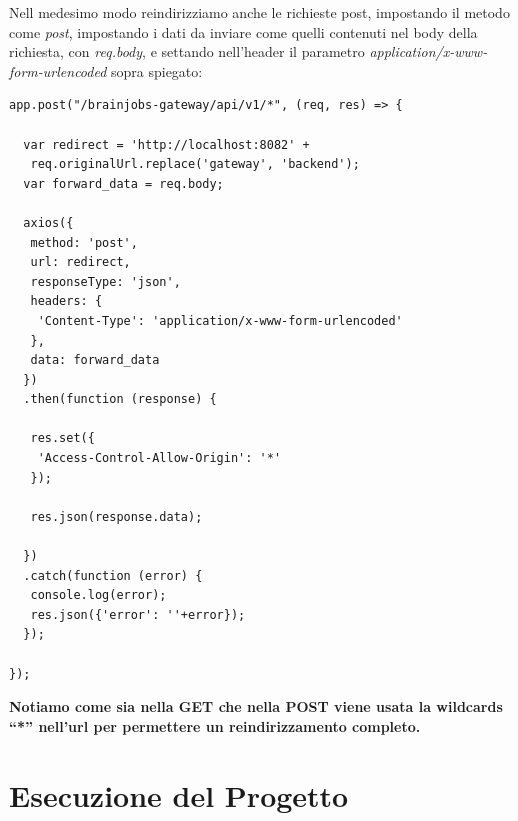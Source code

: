 \documentclass[a4paper,12pt, oneside]{book}
\begin{document}
Nell medesimo modo reindirizziamo anche le richieste post, impostando il metodo come \textit{post}, impostando i dati da inviare come quelli contenuti nel body della richiesta, con \textit{req.body}, e settando nell'header il parametro \textit{application/x-www-form-urlencoded} sopra spiegato:
\begin{shaded} 
\begin{verbatim}
app.post("/brainjobs-gateway/api/v1/*", (req, res) => {

  var redirect = 'http://localhost:8082' +
   req.originalUrl.replace('gateway', 'backend');       
  var forward_data = req.body;

  axios({
   method: 'post',
   url: redirect,
   responseType: 'json',
   headers: {
    'Content-Type': 'application/x-www-form-urlencoded'
   },
   data: forward_data
  })
  .then(function (response) {
  
   res.set({
    'Access-Control-Allow-Origin': '*'                
   });
   
   res.json(response.data);

  })
  .catch(function (error) {
   console.log(error);
   res.json({'error': ''+error});
  });  

});
\end{verbatim}
\end{shaded}
\textbf{Notiamo come sia nella GET che nella POST viene usata la wildcards ``*'' nell'url per permettere un reindirizzamento completo.}
\chapter{Esecuzione del Progetto}
\end{document}
